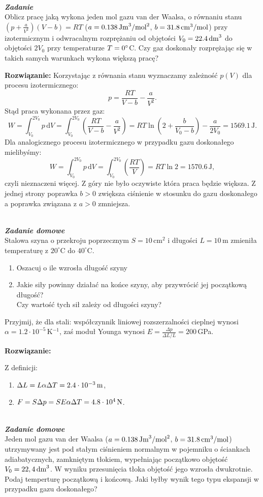 \documentclass[11pt,a4paper]{article}
\newcounter{zadanie}\newcommand{\zadanie}[1][]{\addtocounter{zadanie}{1} ~\\  {\bf \emph{Zadanie \arabic{zadanie} #1 }} \\}
\newcounter{zaddom}\newcommand{\zaddom}[1][]{\addtocounter{zaddom}{1} ~\\  {\bf \emph{Zadanie domowe \arabic{zaddom} #1 }} \\}
\renewcommand{\t}[1]{\textrm{#1}}
\begin{document}
\zadanie
Oblicz pracę jaką wykona jeden mol gazu van der Waalsa, o równaniu stanu
$(p+\frac{a}{V^2})(V-b)=RT$
($a=0.138\,\rm{Jm}^3/\rm{mol}^2$, $b=31.8\,\rm{cm^3/mol}$)
przy izotermicznym i odwracalnym rozprężaniu od objętości $V_0=22.4\,\rm{dm}^3$
do objętości $2 V_0$ przy temperaturze $T=0\degree$C.
Czy gaz doskonały rozprężając się w takich samych warunkach wykona większą pracę?

\vskip 10pt
\textbf{Rozwiązanie:}
Korzystając z równania stanu wyznaczamy zależność $p(V)$ dla procesu izotermicznego:
$$
p = \frac{R T}{V-b} - \frac{a}{V^2}.
$$
Stąd praca wykonana przez gaz:
$$
W = \int_{V_0}^{2 V_0} p \,\t{d}V = \int_{V_0}^{2V_0}\left(\frac{R T}{V-b} - \frac{a}{V^2}\right) = R T \ln \left(2 + \frac{b}{V_0 - b}\right) - \frac{a}{2V_0} = 1569.1\, \t{J}.
$$
Dla analogicznego procesu izotermicznego w przypadku gazu doskonałego mielibyśmy:
$$
W = \int_{V_0}^{2 V_0} p \,\t{d}V = \int_{V_0}^{2V_0}\left(\frac{R T}{V}\right) =  RT \ln 2 =  1570.6\, \t{J},
$$
czyli nieznaczeni więcej. Z góry nie było oczywiste która praca będzie większa. Z jednej strony poprawka $b>0$ zwiększa ciśnienie w stosunku do gazu doskonałego a poprawka związana z $a>0$ zmniejsza.


\pagebreak
\zaddom
Stalowa szyna o przekroju poprzecznym $S = 10\,$cm$^2$ i długości $L = 10\,$m zmieniła temperaturę
z $20^\circ$C do $40^\circ$C.
\begin{enumerate}
\item Oszacuj o ile wzrosła długość szyny
\item Jakie siły powinny działać na końce szyny, aby przywrócić jej początkową długość? \\
      Czy wartość tych sił zależy od długości szyny?
\end{enumerate}
Przyjmij, że dla stali: współczynnik liniowej rozszerzalności cieplnej wynosi $\alpha = 1.2\cdot 10^{-5}\,$K$^{-1}$,
zaś moduł Younga wynosi $\displaystyle E = \frac{\Delta p}{\Delta L/L} = 200\,$GPa.

\vskip 10pt
\textbf{Rozwiązanie:}

Z definicji:
\begin{enumerate}
\item $\Delta L = L \alpha \Delta T = 2.4 \cdot 10^{-3}\, {\rm m}$,
\item $F = S \Delta p = S E \alpha \Delta T = 4.8 \cdot 10^4\, {\rm N}$.
\end{enumerate}


\zaddom
Jeden mol gazu van der Waalsa ($a=0.138\,\rm{Jm}^3/\rm{mol}^2$, $b=31.8\,\rm{cm^3/mol}$)
utrzymywany jest pod stałym ciśnieniem normalnym w pojemniku o ściankach adiabatycznych, zamkniętym tłokiem,
wypełniając początkowo objętość $V_0=22,4\,\rm{dm}^3$.
W wyniku przesunięcia tłoka objętość jego wzrosła dwukrotnie. Podaj temperturę początkową i końcową.  
Jaki byłby wynik tego typu ekspansji w przypadku gazu doskonałego?
\end{document}
